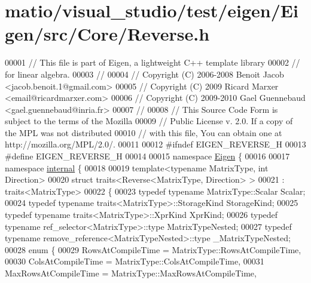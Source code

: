\hypertarget{matio_2visual__studio_2test_2eigen_2_eigen_2src_2_core_2_reverse_8h_source}{}\section{matio/visual\+\_\+studio/test/eigen/\+Eigen/src/\+Core/\+Reverse.h}
\label{matio_2visual__studio_2test_2eigen_2_eigen_2src_2_core_2_reverse_8h_source}

\begin{DoxyCode}
00001 \textcolor{comment}{// This file is part of Eigen, a lightweight C++ template library}
00002 \textcolor{comment}{// for linear algebra.}
00003 \textcolor{comment}{//}
00004 \textcolor{comment}{// Copyright (C) 2006-2008 Benoit Jacob <jacob.benoit.1@gmail.com>}
00005 \textcolor{comment}{// Copyright (C) 2009 Ricard Marxer <email@ricardmarxer.com>}
00006 \textcolor{comment}{// Copyright (C) 2009-2010 Gael Guennebaud <gael.guennebaud@inria.fr>}
00007 \textcolor{comment}{//}
00008 \textcolor{comment}{// This Source Code Form is subject to the terms of the Mozilla}
00009 \textcolor{comment}{// Public License v. 2.0. If a copy of the MPL was not distributed}
00010 \textcolor{comment}{// with this file, You can obtain one at http://mozilla.org/MPL/2.0/.}
00011 
00012 \textcolor{preprocessor}{#ifndef EIGEN\_REVERSE\_H}
00013 \textcolor{preprocessor}{#define EIGEN\_REVERSE\_H}
00014 
00015 \textcolor{keyword}{namespace }\hyperlink{namespace_eigen}{Eigen} \{ 
00016 
00017 \textcolor{keyword}{namespace }\hyperlink{namespaceinternal}{internal} \{
00018 
00019 \textcolor{keyword}{template}<\textcolor{keyword}{typename} MatrixType, \textcolor{keywordtype}{int} Direction>
00020 \textcolor{keyword}{struct }traits<Reverse<MatrixType, Direction> >
00021  : traits<MatrixType>
00022 \{
00023   \textcolor{keyword}{typedef} \textcolor{keyword}{typename} MatrixType::Scalar Scalar;
00024   \textcolor{keyword}{typedef} \textcolor{keyword}{typename} traits<MatrixType>::StorageKind StorageKind;
00025   \textcolor{keyword}{typedef} \textcolor{keyword}{typename} traits<MatrixType>::XprKind XprKind;
00026   \textcolor{keyword}{typedef} \textcolor{keyword}{typename} ref\_selector<MatrixType>::type MatrixTypeNested;
00027   \textcolor{keyword}{typedef} \textcolor{keyword}{typename} remove\_reference<MatrixTypeNested>::type \_MatrixTypeNested;
00028   \textcolor{keyword}{enum} \{
00029     RowsAtCompileTime = MatrixType::RowsAtCompileTime,
00030     ColsAtCompileTime = MatrixType::ColsAtCompileTime,
00031     MaxRowsAtCompileTime = MatrixType::MaxRowsAtCompileTime,

\end{DoxyCode}
